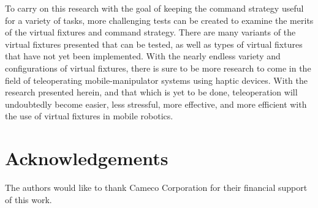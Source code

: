 \documentclass[onecolumn,10pt,final]{asme2ej}
\begin{document}
To carry on this research with the goal of keeping the command strategy useful for a variety of tasks, more challenging tests can be created to examine the merits of the virtual fixtures and command strategy. There are many variants of the virtual fixtures presented that can be tested, as well as types of virtual fixtures that have not yet been implemented. With the nearly endless variety and configurations of virtual fixtures, there is sure to be more research to come in the field of teleoperating mobile-manipulator systems using haptic devices. With the research presented herein, and that which is yet to be done, teleoperation will undoubtedly become easier, less stressful, more effective, and more efficient with the use of virtual fixtures in mobile robotics.\\

\section{Acknowledgements}

The authors would like to thank Cameco Corporation for their financial support of this work.\\






\end{document}
